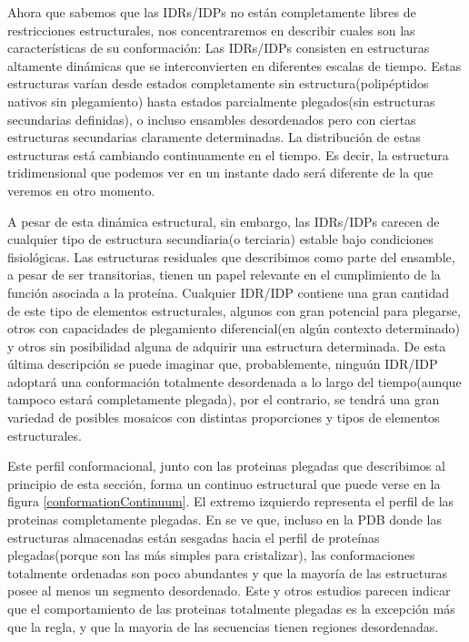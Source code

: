 
Ahora que sabemos que las IDRs/IDPs no están completamente libres de restricciones estructurales, nos concentraremos en describir cuales son las características de su conformación:
Las IDRs/IDPs consisten en estructuras altamente dinámicas que se interconvierten en diferentes escalas de tiempo.
Estas estructuras varían desde estados completamente sin estructura(polipéptidos nativos sin plegamiento) hasta estados parcialmente plegados(sin estructuras secundarias definidas), o incluso ensambles desordenados pero con ciertas
estructuras secundarias claramente determinadas.
La distribución de estas estructuras está cambiando continuamente en el tiempo. 
Es decir, la estructura tridimensional que podemos ver en un instante dado será diferente de la que veremos en otro momento.

A pesar de esta dinámica estructural, sin embargo, las IDRs/IDPs carecen de cualquier tipo de estructura secundiaria(o terciaria) estable bajo condiciones fisiológicas.
Las estructuras residuales que describimos como parte del ensamble, a pesar de ser transitorias, tienen un papel relevante en el cumplimiento de la función asociada a la proteína.
Cualquier IDR/IDP contiene una gran cantidad de este tipo de elementos estructurales, algunos con gran potencial para plegarse, otros con capacidades de plegamiento diferencial(en algún contexto determinado) 
y otros sin posibilidad alguna de adquirir una estructura determinada.
De esta última descripción se puede imaginar que, probablemente, ninguún IDR/IDP adoptará una conformación totalmente desordenada a lo largo del tiempo(aunque tampoco estará completamente plegada), por el contrario, se tendrá una gran variedad
de posibles mosaicos con distintas proporciones y tipos de elementos estructurales.

Este perfil conformacional, junto con las proteinas plegadas que describimos al principio de esta sección, forma un continuo estructural que puede verse en la figura \ref{conformationContinuum}.
El extremo izquierdo representa el perfil de las proteinas completamente plegadas. 
En \cite{gall2007intrinsic} se ve que, incluso en la PDB donde las estructuras almacenadas están sesgadas hacia el perfil de proteínas plegadas(porque son las más simples para cristalizar), las conformaciones totalmente ordenadas son 
poco abundantes y que la mayoría de las estructuras posee al menos un segmento desordenado.
Este y otros estudios parecen indicar que el comportamiento de las proteinas totalmente plegadas es la excepción más que la regla, y que la mayoria de las secuencias tienen regiones desordenadas.


